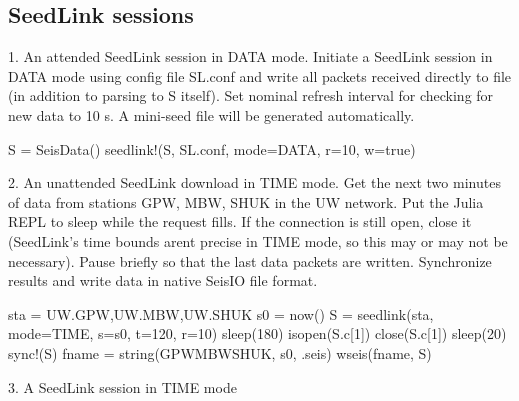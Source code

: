 \documentclass[letterpaper,11pt,english]{sphinxmanual}
\begin{document}
\subsection{SeedLink sessions}
\label{\detokenize{src/Appendices/examples:seedlink-sessions}}
1. An attended SeedLink session in DATA mode. Initiate a SeedLink session in DATA mode using config file SL.conf and write all packets received directly to file (in addition to parsing to S itself). Set nominal refresh interval for checking for new data to 10 s. A mini-seed file will be generated automatically.

\begin{sphinxVerbatim}[commandchars=\\\{\}]
S = SeisData()
seedlink!(S, \PYGZdq{}SL.conf\PYGZdq{}, mode=\PYGZdq{}DATA\PYGZdq{}, r=10, w=true)
\end{sphinxVerbatim}

2. An unattended SeedLink download in TIME mode. Get the next two minutes of data from stations GPW, MBW, SHUK in the UW network. Put the Julia REPL to sleep while the request fills. If the connection is still open, close it (SeedLink’s time bounds arent precise in TIME mode, so this may or may not be necessary). Pause briefly so that the last data packets are written. Synchronize results and write data in native SeisIO file format.

\begin{sphinxVerbatim}[commandchars=\\\{\}]
sta = \PYGZdq{}UW.GPW,UW.MBW,UW.SHUK\PYGZdq{}
s0 = now()
S = seedlink(sta, mode=\PYGZdq{}TIME\PYGZdq{}, s=s0, t=120, r=10)
sleep(180)
isopen(S.c[1]) \PYGZam{}\PYGZam{} close(S.c[1])
sleep(20)
sync!(S)
fname = string(\PYGZdq{}GPW\PYGZus{}MBW\PYGZus{}SHUK\PYGZdq{}, s0, \PYGZdq{}.seis\PYGZdq{})
wseis(fname, S)
\end{sphinxVerbatim}

3. A SeedLink session in TIME mode

\begin{sphinxVerbatim}[commandchars=\\\{\}]
  
     
\end{sphinxVerbatim}
\end{document}
